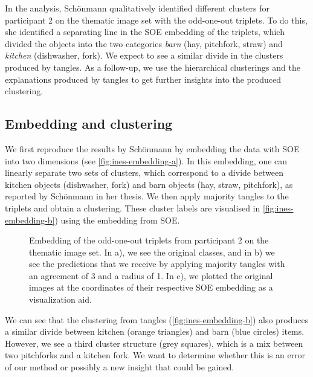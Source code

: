 In the analysis, Schönmann qualitatively identified different clusters for participant 2 on the thematic image set with the odd-one-out triplets. 
To do this, she identified a separating line in the SOE embedding of the triplets, which divided the objects into the two categories \textit{barn} (hay, pitchfork, straw) and 
\textit{kitchen} (dishwasher, fork). We expect to see a similar divide in the clusters produced by tangles. 
As a follow-up, we use the hierarchical clusterings and the explanations produced by tangles to get further insights into the produced clustering. 

\subsection{Embedding and clustering}
We first reproduce the results by Schönmann by embedding the data with SOE into two dimensions 
(see \autoref{fig:ines-embedding-a}). In this embedding, one can linearly separate two sets of clusters, which correspond to a divide between kitchen objects 
(dishwasher, fork) and barn objects (hay, straw, pitchfork), as reported by Schönmann in her thesis.  We then apply majority tangles to the 
triplets and obtain a clustering. These cluster labels are visualised in \autoref{fig:ines-embedding-b}) using the embedding from SOE. 


\begin{figure}[h]
    \centering
    \hfill
    \caption{
        Embedding of the odd-one-out triplets from participant 2 on the thematic image set.
        In a), we see the original classes, and in b) we see the predictions that we receive by
        applying majority tangles with an agreement of 3 and a radius of 1.
        In c), we plotted the original images at the coordinates of their respective SOE embedding as a visualization aid.
    }
    \label{fig:ines-embedding}
\end{figure}

We can see that the clustering from tangles (\autoref{fig:ines-embedding-b}) also produces a similar divide between kitchen (orange triangles) and barn (blue circles) items. 
However, we see a third cluster structure (grey squares), which is a mix between two pitchforks and a kitchen fork. We want to determine whether this is an error of our
method or possibly a new insight that could be gained.

